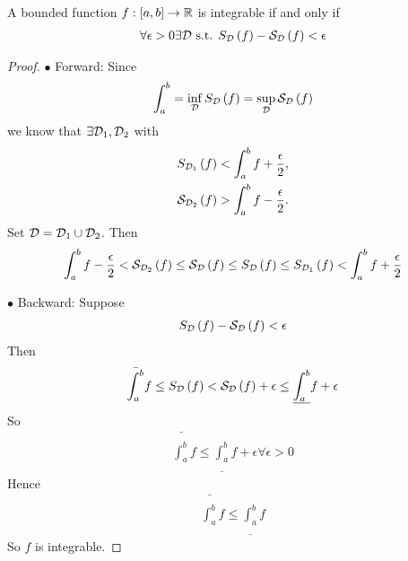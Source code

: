 \documentclass[a4paper]{article}
\begin{document}
\begin{thm}
A bounded function $f:\left[a,b\right]\to\mathbb{R}$ is integrable if and only if
\begin{equation*}
\begin{aligned}
\forall \epsilon > 0 \exists \mathcal{D} \text{ s.t. } S_{\mathcal{D}} \left(f\right) - \mathcal{S}_{\mathcal{D}}\left(f\right) < \epsilon
\end{aligned}
\end{equation*}
\begin{proof}
$\bullet$ Forward: Since
\begin{equation*}
\begin{aligned}
\int_a^b = \inf_{\mathcal{D}} S_{\mathcal{D}} \left(f\right) = \sup_{\mathcal{D}} \mathcal{S}_{\mathcal{D}}\left(f\right)
\end{aligned}
\end{equation*}
we know that $\exists \mathcal{D}_1,\mathcal{D}_2$ with
\begin{equation*}
\begin{aligned}
S_{\mathcal{D}_1}\left(f\right) < \int_a^b f+\frac{\epsilon}{2},\\
\mathcal{S}_{\mathcal{D}_2}\left(f\right) > \int_a^b f-\frac{\epsilon}{2}.
\end{aligned}
\end{equation*}
Set $\mathcal{D} = \mathcal{D}_1 \cup \mathcal{D}_2$. Then
\begin{equation*}
\begin{aligned}
\int_a^b f-\frac{\epsilon}{2} < \mathcal{S}_{\mathcal{D}_2} \left(f\right) \leq \mathcal{S}_{\mathcal{D}} \left(f\right) \leq S_{\mathcal{D}} \left(f\right) \leq S_{\mathcal{D}_1}\left(f\right) < \int_a^b f + \frac{\epsilon}{2}
\end{aligned}
\end{equation*}

$\bullet$ Backward: Suppose
\begin{equation*}
\begin{aligned}
S_{\mathcal{D}} \left(f\right) - \mathcal{S}_{\mathcal{D}} \left(f\right) < \epsilon
\end{aligned}
\end{equation*}
Then
\begin{equation*}
\begin{aligned}
\bar{\int_a^b}f \leq S_{\mathcal{D}}\left(f\right) < \mathcal{S}_{\mathcal{D}} \left(f\right) + \epsilon \leq \underline{\int_a^b}f+\epsilon
\end{aligned}
\end{equation*}
So
\begin{equation*}
\begin{aligned}
\bar{\int_a^b}f \leq \underline{\int_a^b}f + \epsilon \forall \epsilon > 0
\end{aligned}
\end{equation*}
Hence
\begin{equation*}
\begin{aligned}
\bar{\int_a^b}f \leq \underline{\int_a^b}f
\end{aligned}
\end{equation*}
So $f$ is integrable.
\end{proof}
\end{thm}
\end{document}
